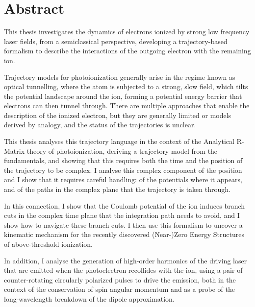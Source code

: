 






\chapter*{Abstract}

\newlength{\abstskip}
\setlength{\abstskip}{8pt}

This thesis investigates the dynamics of electrons ionized by strong low frequency laser fields, from a semiclassical perspective, developing a trajectory-based formalism to describe the interactions of the outgoing electron with the remaining ion.

\vspace{\abstskip}
\noindent
Trajectory models for photoionization generally arise in the regime known as optical tunnelling, where the atom is subjected to a strong, slow field, which tilts the potential landscape around the ion, forming a potential energy barrier that electrons can then tunnel through. There are multiple approaches that enable the description of the ionized electron, but they are generally limited or models derived by analogy, and the status of the trajectories is unclear.

\vspace{\abstskip}
\noindent
This thesis analyses this trajectory language in the context of the Analytical R-Matrix theory of photoionization, deriving a trajectory model from the fundamentals, and showing that this requires both the time and the position of the trajectory to be complex. I analyse this complex component of the position and I show that it requires careful handling: of the potentials where it appears, and of the paths in the complex plane that the trajectory is taken through.

\vspace{\abstskip}
\noindent
In this connection, I show that the Coulomb potential of the ion induces branch cuts in the complex time plane that the integration path needs to avoid, and I show how to navigate these branch cuts. I then use this formalism to uncover a kinematic mechanism for the recently discovered (Near-)Zero Energy Structures of above-threshold ionization.

\vspace{\abstskip}
\noindent
In addition, I analyse the generation of high-order harmonics of the driving laser that are emitted when the photoelectron recollides with the ion, using a pair of counter-rotating circularly polarized pulses to drive the emission, both in the context of the conservation of spin angular momentum and as a probe of the long-wavelength breakdown of the dipole approximation.











